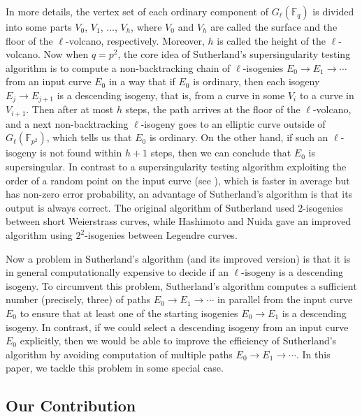 \documentclass{article}
\theoremstyle{definition}
\newcommand{\FF}{\mathbb{F}}
\begin{document}
In more details, the vertex set of each ordinary component of $G_{\ell}(\FF_q)$ is divided into some parts $V_0$, $V_1$, $\dots$, $V_h$, where $V_0$ and $V_h$ are called the surface and the floor of the $\ell$-volcano, respectively.
Moreover, $h$ is called the height of the $\ell$-volcano.
Now when $q = p^2$, the core idea of Sutherland's supersingularity testing algorithm is to compute a non-backtracking chain of $\ell$-isogenies $E_0 \to E_1 \to \cdots$ from an input curve $E_0$ in a way that if $E_0$ is ordinary, then each isogeny $E_j \to E_{j+1}$ is a descending isogeny, that is, from a curve in some $V_i$ to a curve in $V_{i+1}$.
Then after at most $h$ steps, the path arrives at the floor of the $\ell$-volcano, and a next non-backtracking $\ell$-isogeny goes to an elliptic curve outside of $G_{\ell}(\FF_{p^2})$, which tells us that $E_0$ is ordinary.
On the other hand, if such an $\ell$-isogeny is not found within $h + 1$ steps, then we can conclude that $E_0$ is supersingular.
In contrast to a supersingularity testing algorithm exploiting the order of a random point on the input curve (see \cite[Algorithm 1]{DBLP:journals/lmsjcm/Sutherland12a}), which is faster in average but has non-zero error probability, an advantage of Sutherland's algorithm is that its output is always correct.
The original algorithm of Sutherland \cite{DBLP:journals/lmsjcm/Sutherland12a} used $2$-isogenies between short Weierstrass curves, while Hashimoto and Nuida \cite{DBLP:conf/casc/HashimotoN21,DBLP:journals/ieiceta/HashimotoN23} gave an improved algorithm using $2^2$-isogenies between Legendre curves.

Now a problem in Sutherland's algorithm (and its improved version) is that it is in general computationally expensive to decide if an $\ell$-isogeny is a descending isogeny.
To circumvent this problem, Sutherland's algorithm computes a sufficient number (precisely, three) of paths $E_0 \to E_1 \to \cdots$ in parallel from the input curve $E_0$ to ensure that at least one of the starting isogenies $E_0 \to E_1$ is a descending isogeny.
In contrast, if we could select a descending isogeny from an input curve $E_0$ explicitly, then we would be able to improve the efficiency of Sutherland's algorithm by avoiding computation of multiple paths $E_0 \to E_1 \to \cdots$.
In this paper, we tackle this problem in some special case.


\subsection{Our Contribution}
\label{sec:introduction:contribution}
\end{document}
